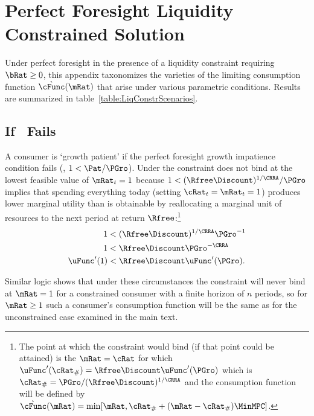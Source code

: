 \documentclass[../BufferStockTheory.tex]{subfiles}
\begin{document}
\let\TableWidth\relax
\newlength\TableWidth
\providecommand{\FigsRawApndx}{\econtexRoot/Code/Mathematica/Results/BufferStockTheory/Figures}

\section{Perfect Foresight Liquidity Constrained Solution}\label{sec:ApndxLiqConstr}

  Under perfect foresight in the presence of a liquidity constraint requiring $\bRat
  \geq 0$, this appendix taxonomizes the varieties of the limiting
  consumption function $\grave{\cFunc}(\mRat)$ that arise under various parametric conditions.  Results are summarized in table~\ref{table:LiqConstrScenarios}.



\subsection{If \PFGIC~Fails}

A consumer is `growth patient' if the perfect foresight growth
impatience condition fails (\cncl{\PFGIC}, $1 < \Pat/\PGro$).  Under
\cncl{\PFGIC} the constraint does not bind at the lowest feasible value of $\mRat_{t}=1$ because
$1 < (\Rfree\Discount)^{1/\CRRA}/\PGro$ implies that spending
everything today (setting $\cRat_{t}=\mRat_{t}=1$) produces lower
marginal utility than is obtainable by reallocating a marginal unit of
resources to the next period at return $\Rfree$:\footnote{The point at
  which the constraint would bind (if that point could be attained) is
  the $\mRat=\cRat$ for which $\uFunc^{\prime}(\cRat_{\#}) = \Rfree
  \Discount \uFunc^{\prime}(\PGro)$ which is $\cRat_{\#} =
  \PGro/(\Rfree \Discount)^{1/\CRRA}$ and the consumption function
  will be defined by
  $\grave{\cFunc}(\mRat)=\min[\mRat,\cRat_{\#}+(\mRat-\cRat_{\#})\MinMPC
  ]$.}
\begin{align}
1  & < (\Rfree \Discount)^{1/\CRRA}\PGro^{-1}    
\\ 1  & < \Rfree \Discount \PGro^{-\CRRA}
\\  \uFunc^{\prime}(1)  & < \Rfree \Discount \uFunc^{\prime}(\PGro)   \label{eq:EulerPFGICFailsEnd}.
\end{align}

Similar logic shows that under these circumstances the constraint will
never bind at $\mRat=1$ for a constrained consumer with a finite horizon of $n$
periods, so for $\mRat \geq 1$ such a consumer's consumption function will be the same as for the
unconstrained case examined in the main text.
\end{document}
